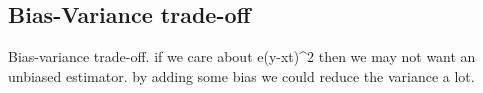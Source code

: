 
\subsection{Bias-Variance trade-off}

Bias-variance trade-off. if we care about e(y-xt)^2 then we may not want an unbiased estimator. by adding some bias we could reduce the variance a lot.
